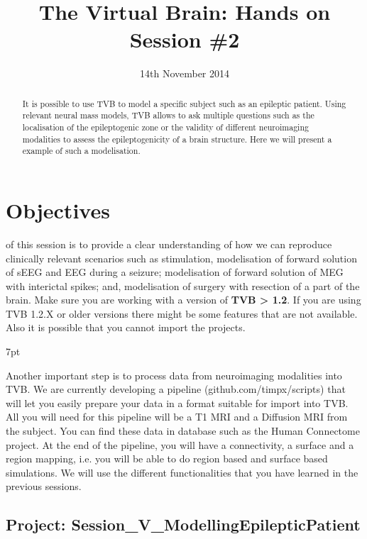 \documentclass{tufte-handout}
\title{The Virtual Brain: Hands on Session \#2}
\date{14th November 2014}
\newenvironment{blah}{%
  \def\FrameCommand{%
    \hspace{1pt}%
    {\color{DarkOrange}\vrule width 2pt}%
    {\color{PeachPuff}\vrule width 4pt}%
    \colorbox{PeachPuff}%
  }%
  \MakeFramed{\advance\hsize-\width\FrameRestore}%
  \noindent\hspace{-4.55pt}%
  \begin{adjustwidth}{}{7pt}%
  \vspace{2pt}\vspace{2pt}%
}
{%
  \vspace{2pt}\end{adjustwidth}\endMakeFramed%
}
\begin{document}

\newpage
\ClearWallPaper


\begin{abstract}
\noindent It is possible to use TVB to model a specific subject such as an epileptic patient. Using relevant neural
mass models, TVB allows to ask multiple questions such as the localisation of the epileptogenic zone or the validity
of different neuroimaging modalities to assess the epileptogenicity of a brain structure. Here we will present a example of
such a modelisation.
\end{abstract}


 

\section{Objectives}\label{sec:objectives}
 of this session is to provide a clear understanding of how we can reproduce clinically
relevant scenarios such as stimulation, modelisation of forward solution of sEEG and EEG during a seizure; modelisation of
forward solution of MEG  with interictal spikes; and, modelisation of surgery with resection of a part of the brain.
Make sure you are working with a version of \textbf{TVB > 1.2}. If you are using TVB 1.2.X or older versions there might be some features that are not available. Also it is possible that you cannot import the projects.

\begin{blah}
Another important step is to process data from neuroimaging modalities into TVB. We are currently developing a pipeline (github.com/timpx/scripts) that will let you easily prepare your data in a format suitable for import
into TVB. All you will need for this pipeline will be a T1 MRI and a Diffusion MRI from the subject. You can find these data
in database such as the Human Connectome project. At the end of the pipeline, you will have a connectivity, a surface and a region mapping,
i.e. you will be able to do region based and surface based simulations.
We will use the different functionalities that you have learned in the previous sessions.
\end{blah}

\subsection{Project: Session\_V\_ModellingEpilepticPatient }\label{sec:project_data}
\end{document}
